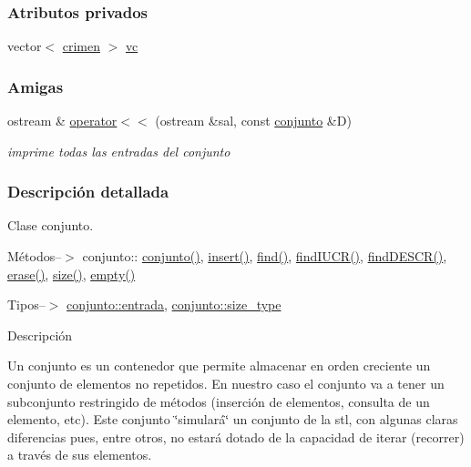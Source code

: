 \subsubsection*{Atributos privados}
\begin{DoxyCompactItemize}
\item 
vector$<$ \hyperlink{classcrimen}{crimen} $>$ \hyperlink{classconjunto_aed485e92bb3d8b2c82fc85657947761d}{vc}
\end{DoxyCompactItemize}
\subsubsection*{Amigas}
\begin{DoxyCompactItemize}
\item 
ostream \& \hyperlink{classconjunto_ae54b721035471d372f29c0335c42734a}{operator$<$$<$} (ostream \&sal, const \hyperlink{classconjunto}{conjunto} \&D)
\begin{DoxyCompactList}\small\item\em imprime todas las entradas del conjunto \end{DoxyCompactList}\end{DoxyCompactItemize}


\subsubsection{Descripción detallada}
Clase conjunto. 

Métodos--$>$ conjunto\+:\+: \hyperlink{classconjunto_a16d987f42c679efab01748178ba45891}{conjunto()}, \hyperlink{classconjunto_aa65b9f7c4cb9bad6d4e40c1973095930}{insert()}, \hyperlink{classconjunto_a64ee1c67331bce15dc029048631dda97}{find()}, \hyperlink{classconjunto_a50eb93f152dc973726d184733d7ecd98}{find\+I\+U\+C\+R()}, \hyperlink{classconjunto_a5190c59db573008cc48a8ce734954a96}{find\+D\+E\+S\+C\+R()}, \hyperlink{classconjunto_ad550177fa4454da3a10fa356417e39a7}{erase()}, \hyperlink{classconjunto_a863e1e106e35adda47e7c5e2067295b9}{size()}, \hyperlink{classconjunto_afcf4ff3ff3c1f83b63e901efebe93533}{empty()}

Tipos--$>$ \hyperlink{classconjunto_a09cad766dd65de73e51eae21f9d22585}{conjunto\+::entrada}, \hyperlink{classconjunto_a855a5893bb0f5a851ab2dbf2b8aa6cc7}{conjunto\+::size\+\_\+type}

Descripción

Un conjunto es un contenedor que permite almacenar en orden creciente un conjunto de elementos no repetidos. En nuestro caso el conjunto va a tener un subconjunto restringido de métodos (inserción de elementos, consulta de un elemento, etc). Este conjunto \char`\"{}simulará\char`\"{} un conjunto de la stl, con algunas claras diferencias pues, entre otros, no estará dotado de la capacidad de iterar (recorrer) a través de sus elementos.

